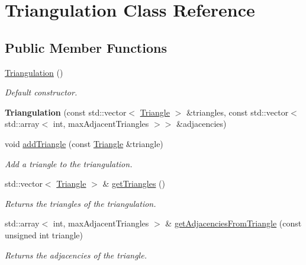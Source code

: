 \hypertarget{classTriangulation}{}\section{Triangulation Class Reference}
\label{classTriangulation}
\subsection*{Public Member Functions}
\begin{DoxyCompactItemize}
\item 
\mbox{\label{classTriangulation_a56118103ad86aa7b37d7a005892bfeca}} 
\hyperlink{classTriangulation_a56118103ad86aa7b37d7a005892bfeca}{Triangulation} ()
\begin{DoxyCompactList}\small\item\em Default constructor. \end{DoxyCompactList}\item 
\mbox{\label{classTriangulation_ae1d2320b4ca69156f29a4e27dff921f1}} 
{\bfseries Triangulation} (const std\+::vector$<$ \hyperlink{classTriangle}{Triangle} $>$ \&triangles, const std\+::vector$<$ std\+::array$<$ int, max\+Adjacent\+Triangles $>$$>$ \&adjacencies)
\item 
void \hyperlink{classTriangulation_a2143e3330a01aeb0c49343e20a513e41}{add\+Triangle} (const \hyperlink{classTriangle}{Triangle} \&triangle)
\begin{DoxyCompactList}\small\item\em Add a triangle to the triangulation. \end{DoxyCompactList}\item 
std\+::vector$<$ \hyperlink{classTriangle}{Triangle} $>$ \& \hyperlink{classTriangulation_a9245c1ffae5777f76f51b217f267d594}{get\+Triangles} ()
\begin{DoxyCompactList}\small\item\em Returns the triangles of the triangulation. \end{DoxyCompactList}\item 
std\+::array$<$ int, max\+Adjacent\+Triangles $>$ \& \hyperlink{classTriangulation_a82cec4438c1f8b17f4d96160bdebb365}{get\+Adjacencies\+From\+Triangle} (const unsigned int triangle)
\begin{DoxyCompactList}\small\item\em Returns the adjacencies of the triangle. \end{DoxyCompactList}\item 
$$
\end{DoxyCompactItemize}
